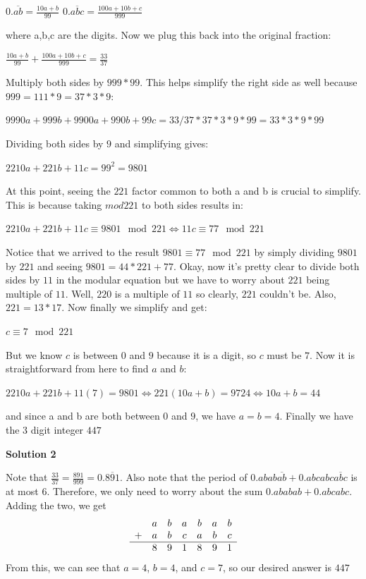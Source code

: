 \begin{enumerate}
 $0.\overline{ab}=\frac{10a+b}{99}$
$0.\overline{abc}=\frac{100a+10b+c}{999}$

 where a,b,c are the digits. Now we plug this back into the original fraction:

 $\frac{10a+b}{99}+\frac{100a+10b+c}{999}=\frac{33}{37}$

 Multiply both sides by $999*99.$ This helps simplify the right side as well because $999=111*9=37*3*9$:

 $9990a+999b+9900a+990b+99c=33/37*37*3*9*99=33*3*9*99$

 Dividing both sides by $9$ and simplifying gives:

 $2210a+221b+11c=99^2=9801$

 At this point, seeing the $221$ factor common to both a and b is crucial to simplify. This is because taking $mod 221$ to both sides results in:

 $2210a+221b+11c  \equiv 9801 \mod 221 \iff 11c  \equiv 77 \mod 221$

 Notice that we arrived to the result $9801 \equiv 77 \mod 221$ by simply dividing $9801$ by $221$ and seeing $9801=44*221+77.$ Okay, now it's pretty clear to divide both sides by $11$ in the modular equation but we have to worry about $221$ being multiple of $11.$ Well, $220$ is a multiple of $11$ so clearly, $221$ couldn't be. Also, $221=13*17.$ Now finally we simplify and get:

 $c \equiv 7 \mod 221$

 But we know $c$ is between $0$ and $9$ because it is a digit, so $c$ must be $7.$ Now it is straightforward from here to find $a$ and $b$:

 $2210a+221b+11(7)=9801 \iff 221(10a+b)=9724 \iff 10a+b=44$

 and since a and b are both between $0$ and $9$, we have $a=b=4$. Finally we have the $3$ digit integer $\boxed{447}$




\textbf{Solution 2}

Note that $\frac{33}{37}=\frac{891}{999} = 0.\overline{891}$.  Also note that the period of $0.abab\overline{ab}+0.abcabc\overline{abc}$ is at most $6$.  Therefore, we only need to worry about the sum $0.ababab+ 0.abcabc$.  Adding the two, we get
 \[\begin{array}{ccccccc}&a&b&a&b&a&b\\ +&a&b&c&a&b&c\\ \hline &8&9&1&8&9&1\end{array}\]From this, we can see that $a=4$, $b=4$, and $c=7$, so our desired answer is $\boxed{447}$





\end{enumerate}
